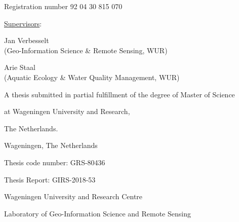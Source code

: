 \documentclass[a4paper]{article}
\begin{document}
\newpage
\begin{titlepage} %

  \thispagestyle{plain} %
  \pagestyle{plain}
  \setcounter{page}{2}

  \begin{center}
  {\bfseries \Large \thetitle}\vspace{0.9cm}
  
  
  {\Large \theauthor}\vspace{0.9cm}
  
  {Registration number 92 04 30 815 070}\vspace{3.5cm}
  
  {\large \underline{Supervisors}:}\vspace{1.1cm}
  
  {Jan Verbesselt}\\
  {(Geo-Information Science \& Remote Sensing, WUR)}\vspace{0.5cm}
  
  {Arie Staal}\\
  {(Aquatic Ecology \& Water Quality Management, WUR)}\vspace{3.5cm}
  
  {A thesis submitted in partial fulfillment of the degree of Master of Science}
  
  {at Wageningen University and Research,}
  
  {The Netherlands.}\vspace{1.1cm}
  \end{center}
  
  \begin{flushright}
    {\thedate}
  
    {Wageningen, The Netherlands}
  \end{flushright}\vspace{0.5cm}

    Thesis code number: GRS-80436
  
    Thesis Report: GIRS-2018-53
  
    {Wageningen University and Research Centre}
  
    {Laboratory of Geo-Information Science and Remote Sensing}
    
\end{titlepage}    
\newpage\null\setcounter{page}{3}
\end{document}
